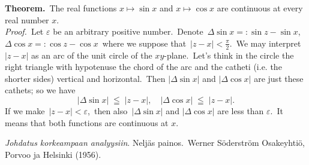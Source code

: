 \documentclass[12pt]{article}
\theoremstyle{definition}
\begin{document}
\textbf{Theorem.}\, The real functions \;$x\mapsto\sin{x}$\; 
and\; $x\mapsto\cos{x}$\; are continuous at every real number $x$.\\

{\em Proof.}\, Let $\varepsilon$ be an arbitrary positive number.\, 
Denote\, $\Delta\sin{x} =: \sin{z}-\sin{x}$,\, 
$\Delta\cos{x} =: \cos{z}-\cos{x}$\, where we suppose that\, 
$|z-x| < \frac{\pi}{2}$.\, We may interpret $|z-x|$ as an arc 
of the unit circle of the $xy$-plane.\, Let's think in the 
circle the right triangle with hypotenuse the chord of the arc and 
the catheti (i.e. the shorter sides) vertical and horizontal.\, Then 
$|\Delta\sin{x}|$ and $|\Delta\cos{x}|$ are just these cathets; so we have
$$|\Delta\sin{x}| \;\leqq\; |z-x|, \quad |\Delta\cos{x}| \;\leqq\; |z-x|.$$
If we make\, $|z-x| < \varepsilon$,\, then also\, $|\Delta\sin{x}|$ and 
$|\Delta\cos{x}|$ are less than $\varepsilon$.\, It means that both 
functions are continuous at $x$.



\begin{thebibliography}{9}
 {\em Johdatus korkeampaan analyysiin}. Nelj\"as painos.\, Werner S\"oderstr\"om Osakeyhti\"o, Porvoo ja Helsinki (1956).
\end{thebibliography}
\end{document}
